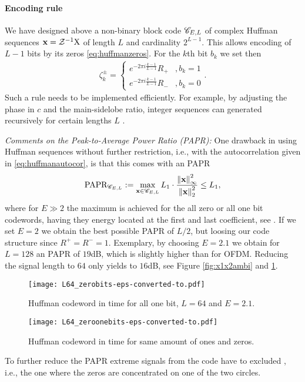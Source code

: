 \documentclass[conference]{IEEEtran}
\begin{document}
\paragraph*{Encoding rule} We have designed above a non-binary block code $\mathscr C_{E,L}$ of complex Huffman sequences
${\mathbf x}={\mathcal Z}^{-1}{\mathrm X}$ of length $L$ and cardinality $2^{L-1}$. This allows encoding of $L-1$ bits by its zeros
\eqref{eq:huffmanzeros}. For the $k$th bit $b_k$ we set then
%
\begin{align}
  \zeta_k^{\pm}=\begin{cases}  e^{-2\pi i\frac{k-1}{L-1}}R_+ &, b_k =1\\
    e^{-2\pi i\frac{k-1}{L-1}} R_- &, b_k = 0\end{cases}.\label{eq:encdoingrule}
\end{align}
%
Such a rule needs to be implemented efficiently. For example, by adjusting the phase in $c$ and the
main-sidelobe ratio, integer sequences can generated recursively for certain lengths $L$ \cite{Lue92}.   

{\em Comments on the Peak-to-Average Power Ratio (PAPR):}
One drawback in using Huffman sequences without further restriction, i.e., with the
autocorrelation given in \eqref{eq:huffmanautocor}, is that this comes 
with an PAPR 
%
\begin{align}
  \text{PAPR}_{\mathscr C_{E,L}}: = \max_{{\mathbf x}\in\mathscr C_{E,L}} L_1\cdot\frac{ \left\|{\mathbf x}\right\| _{\infty}^2}{ \left\|{\mathbf x}\right\| _2^2} \leq L_1,
\end{align}
%
where for $E\gg 2$ the maximum is achieved for the all zero or all one bit codewords, having they energy located at the first and last
coefficient, see . If we set $E=2$ we obtain the best possible PAPR of $L/2$, but loosing our code
structure since $R^+=R^{-}=1$. Exemplary, by choosing $E=2.1$ we obtain for $L=128$ an PAPR of $19$dB, which is slightly higher
than for OFDM. Reducing the signal length to $64$ only yields to
$16$dB, see Figure \ref{fig:x1x2ambi} and \ref{fig:sameonezero}.
%
\begin{figure}[t]
  \begin{minipage}{0.495\columnwidth}
    \texttt{[image: L64\_zerobits-eps-converted-to.pdf]}
    \caption{Huffman codeword in time for all one bit, $L=64$ and $E=2.1$.}\label{fig:x1x2ambi}
  \end{minipage}
  \begin{minipage}{0.495\columnwidth}
    \texttt{[image: L64\_zeroonebits-eps-converted-to.pdf]}
    \caption{Huffman codeword in time for same amount of ones and zeros.}\label{fig:sameonezero}
  \end{minipage}
\end{figure}
%
To further reduce the PAPR extreme signals from the code have to excluded
, i.e., the one where the zeros are concentrated on one of the two
circles. 
%
\end{document}
